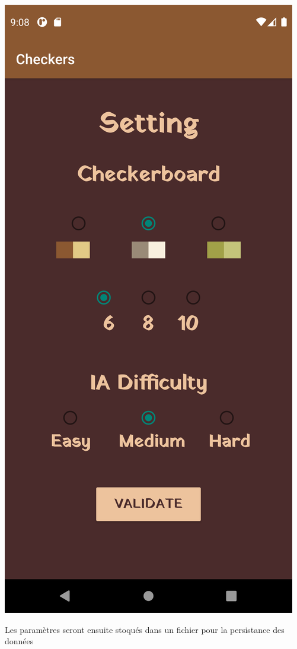 \documentclass{beamer}
\begin{document}
\begin{frame}
\begin{center}
    \includegraphics[scale=0.05]{setting_en.png}
  \end{center}

  \begin{center}
    Les paramètres seront ensuite stoqués 
    dans un fichier pour la persistance des données
  \end{center}

\end{frame}
\end{document}
